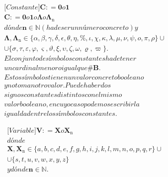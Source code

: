 \documentclass[
]{article}
\begin{document}
\begin{enumerate}
\begin{enumerate}
\begin{enumerate}
\begin{enumerate}
        \[\begin{matrix}
        {{\lbrack\mathbf{\mathit{Constante}}\rbrack}{\mathbf{C}{: =}\mathbf{0}o\mathbf{1}}} \\
        {\mathbf{C}{: =}\mathbf{0}o\mathbf{1}o\mathbf{\Lambda}o\mathbf{\Lambda_{\mathrm{n}}}} \\
        {\mathit{dónde}{\mathbf{n} \in \mathbb{N}}{({\mathit{ha}\mathit{de}\mathit{ser}\mathit{un}\mathit{número}\mathit{concreto}})}y} \\
        {\mathbf{\Lambda},{\mathbf{\Lambda_{\mathrm{n}}} \in {{\{{\alpha,\beta,\gamma,\delta,\epsilon,\theta,\eta,\%,\iota,\chi,\kappa,\lambda,\mu,\nu,\psi,ο,\pi,\rho}\}} \cup}}} \\
        {{\cup {\{{\sigma,\tau,\varepsilon,\varphi,\varsigma,\vartheta,\xi,\upsilon,\zeta,\omega,\varrho,\varpi}\}}}.} \\
        {\mathit{El}\mathit{conjunto}\mathit{de}\mathit{símbolos}\mathit{constantes}\mathit{ha}\mathit{de}\mathit{tener}} \\
        {\mathit{un}\mathit{cardinal}\mathit{menor}o\mathit{igual}\mathit{que}\mathbf{\# B}.} \\
        {\mathit{Estos}\mathit{símbolos}\mathit{tienen}\mathit{un}\mathit{valor}\mathit{concreto}\mathit{booleano}} \\
        {y\mathit{no}\mathit{toman}\mathit{otro}\mathit{valor.}\mathit{Puede}\mathit{haber}\mathit{dos}} \\
        {\mathit{signos}\mathit{constantes}\mathit{distintos}\mathit{con}\mathit{el}\mathit{mismo}} \\
        {\mathit{valor}\mathit{booleano},\mathit{en}\mathit{cuyo}\mathit{caso}\mathit{podemos}\mathit{escribir}\mathit{la}} \\
        {\mathit{igualdad}\mathit{entre}\mathit{los}\mathit{símbolos}\mathit{constantes.}}
        \end{matrix}\]

        \[\begin{matrix}
        {{\lbrack\mathbf{\mathit{Variable}}\rbrack}\mathbf{V}{: =}\mathbf{X}o\mathbf{X_{\mathrm{n}}}} \\
        \mathit{dónde} \\
        {\mathbf{X},{\mathbf{X_{\mathrm{n}}} \in {{\{{a,b,c,d,e,f,g,h,i,j,k,l,m,n,o,p,q,r}\}} \cup}}} \\
        {{\cup {\{{s,t,u,v,w,x,y,z}\}}}\phantom{\{\}}} \\
        {y\mathit{dónde}\mathbf{n}{\in}\mathbf{\mathbb{N}}.}
        \end{matrix}\]


\end{enumerate}
\end{enumerate}
\end{enumerate}
\end{enumerate}
\end{document}
